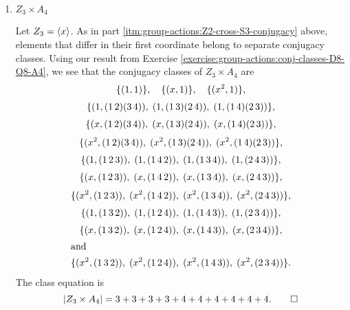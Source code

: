 \begin{enumerate}
\item $Z_3\times A_4$
  \begin{solution}
    Let $Z_3 = \langle{x}\rangle$. As in part
    \ref{itm:group-actions:Z2-cross-S3-conjugacy} above, elements that
    differ in their first coordinate belong to separate conjugacy
    classes. Using our result from Exercise
    \ref{exercise:group-actions:conj-classes-D8-Q8-A4}, we see that
    the conjugacy classes of $Z_3\times A_4$ are
    \begin{gather*}
      \{(1,1)\}, \quad \{(x,1)\}, \quad \{(x^2,1)\}, \\[3pt]
      \{(1, (1\,2)(3\,4)),\; (1, (1\,3)(2\,4)),\; (1, (1\,4)(2\,3))\}, \\[3pt]
      \{(x, (1\,2)(3\,4)),\; (x, (1\,3)(2\,4)),\; (x, (1\,4)(2\,3))\}, \\[3pt]
      \{(x^2, (1\,2)(3\,4)),\; (x^2, (1\,3)(2\,4)),\; (x^2, (1\,4)(2\,3))\}, \\[3pt]
      \{(1, (1\,2\,3)),\; (1, (1\,4\,2)),\; (1, (1\,3\,4)),\; (1, (2\,4\,3))\}, \\[3pt]
      \{(x, (1\,2\,3)),\; (x, (1\,4\,2)),\; (x, (1\,3\,4)),\; (x, (2\,4\,3))\}, \\[3pt]
      \{(x^2, (1\,2\,3)),\; (x^2, (1\,4\,2)),\; (x^2, (1\,3\,4)),\; (x^2, (2\,4\,3))\}, \\[3pt]
      \{(1, (1\,3\,2)),\; (1, (1\,2\,4)),\; (1, (1\,4\,3)),\; (1, (2\,3\,4))\}, \\[3pt]
      \{(x, (1\,3\,2)),\; (x, (1\,2\,4)),\; (x, (1\,4\,3)),\; (x, (2\,3\,4))\}, \\
      \intertext{and}
      \{(x^2, (1\,3\,2)),\; (x^2, (1\,2\,4)),\; (x^2, (1\,4\,3)),\; (x^2, (2\,3\,4))\}.
    \end{gather*}
    The class equation is
    \begin{equation*}
      \lvert{Z_3\times A_4}\rvert = 3 + 3 + 3 + 3 + 4 + 4 + 4 + 4 + 4 + 4. \qedhere
    \end{equation*}
  \end{solution}
\end{enumerate}


